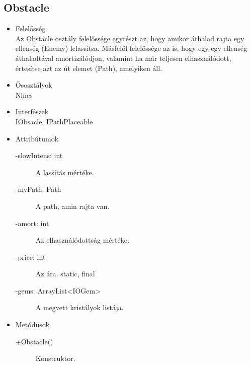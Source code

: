 \subsection{Obstacle}
\begin{itemize}
\item Felelősség\\
Az Obstacle osztály felelőssége egyrészt az, hogy amikor áthalad rajta egy ellenség (Enemy) lelassítsa. Másfelől felelőssége az is, hogy egy-egy ellenség  áthaladtával amortizálódjon, valamint ha már teljesen elhasználódott, értesítse azt az út elemet (Path), amelyiken áll.
\item Ősosztályok\\
Nincs
\item Interfészek\\
IObsacle, IPathPlaceable
\item Attribútumok\\
	\begin{description}
	\item[-slowIntens: int] A lassítás mértéke. 
\item[-myPath: Path] A path, amin rajta van. 
\item[-amort: int] Az elhasználódottság mértéke. 
\item[-price: int] Az ára. static, final
\item[-gems: ArrayList<IOGem>] A megvett kristályok listája. 


	\end{description}
\item Metódusok\\
	\begin{description}
		
		\item[+Obstacle()] Konstruktor. 
		
		
	\end{description}
\end{itemize}
